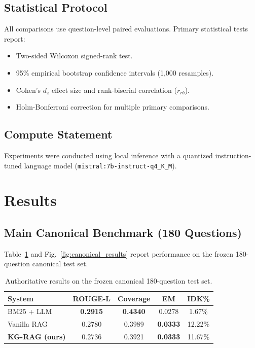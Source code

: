 \documentclass[conference]{IEEEtran}
\begin{document}
\subsection{Statistical Protocol}
All comparisons use question-level paired evaluations. Primary statistical tests report:
\begin{itemize}
    \item Two-sided Wilcoxon signed-rank test.
    \item 95\% empirical bootstrap confidence intervals (1,000 resamples).
    \item Cohen's $d_z$ effect size and rank-biserial correlation ($r_{rb}$).
    \item Holm-Bonferroni correction for multiple primary comparisons.
\end{itemize}

\subsection{Compute Statement}
Experiments were conducted using local inference with a quantized instruction-tuned language model (\texttt{mistral:7b-instruct-q4\_K\_M}).

\section{Results}
\label{sec:results}

\subsection{Main Canonical Benchmark (180 Questions)}
\label{sec:res_canonical}

Table~\ref{tab:canonical_results} and Fig.~\ref{fig:canonical_results} report performance on the frozen 180-question canonical test set.

\begin{table}[h]
\centering
\caption{Authoritative results on the frozen canonical 180-question test set.}
\label{tab:canonical_results}
\begin{tabular}{lcccc}
\toprule
\textbf{System} & \textbf{ROUGE-L} & \textbf{Coverage} & \textbf{EM} & \textbf{IDK\%} \\
\midrule
BM25 + LLM             & \textbf{0.2915} & \textbf{0.4340} & 0.0278 & 1.67\% \\
Vanilla RAG            & 0.2780 & 0.3989 & \textbf{0.0333} & 12.22\% \\
\textbf{KG-RAG (ours)} & 0.2736 & 0.3921 & \textbf{0.0333} & 11.67\% \\
\bottomrule
\end{tabular}
\end{table}
\end{document}
